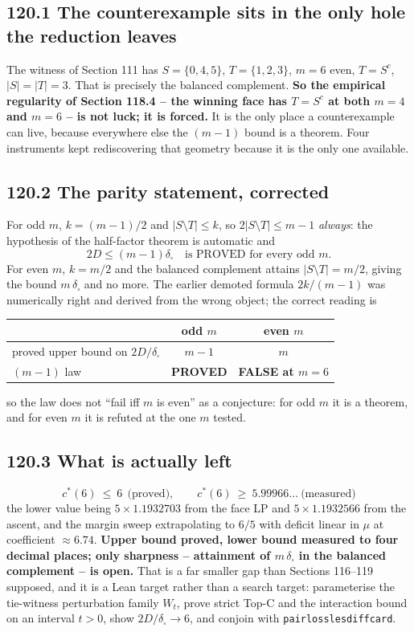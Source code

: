 \documentclass[9pt,twocolumn]{article}
\renewcommand{\_}{\CIGunderscore\allowbreak}
\begin{document}
\subsection*{120.1 The counterexample sits in the only hole the reduction leaves}
The witness of Section 111 has $S=\{0,4,5\}$, $T=\{1,2,3\}$, $m=6$ even, $T=S^{c}$, $|S|=|T|=3$. That is precisely the balanced complement. \textbf{So the empirical regularity of Section 118.4 -- the winning face has $T=S^{c}$ at both $m=4$ and $m=6$ -- is not luck; it is forced.} It is the only place a counterexample can live, because everywhere else the $(m-1)$ bound is a theorem. Four instruments kept rediscovering that geometry because it is the only one available.

\subsection*{120.2 The parity statement, corrected}
For odd $m$, $k=(m-1)/2$ and $|S\setminus T|\le k$, so $2|S\setminus T|\le m-1$ \emph{always}: the hypothesis of the half-factor theorem is automatic and
\[
2D\le(m-1)\delta_{\square}\quad\text{is PROVED for every odd }m.
\]
For even $m$, $k=m/2$ and the balanced complement attains $|S\setminus T|=m/2$, giving the bound $m\,\delta_{\square}$ and no more. The earlier demoted formula $2k/(m-1)$ was numerically right and derived from the wrong object; the correct reading is
\begin{center}\scriptsize
\begin{tabularx}{0.98\columnwidth}{Xcc}
\toprule
 & odd $m$ & even $m$\\
\midrule
proved upper bound on $2D/\delta_{\square}$ & $m-1$ & $m$\\
$(m-1)$ law & \textbf{PROVED} & \textbf{FALSE at $m{=}6$}\\
\bottomrule
\end{tabularx}
\end{center}
so the law does not ``fail iff $m$ is even'' as a conjecture: for odd $m$ it is a theorem, and for even $m$ it is refuted at the one $m$ tested.

\subsection*{120.3 What is actually left}
\[
c^\ast(6)\ \le\ 6\ \ \text{(proved)},\qquad
c^\ast(6)\ \ge\ 5.99966\ldots\ \text{(measured)}
\]
the lower value being $5\times1.1932703$ from the face LP and $5\times1.1932566$ from the ascent, and the margin sweep extrapolating to $6/5$ with deficit linear in $\mu$ at coefficient $\approx6.74$. \textbf{Upper bound proved, lower bound measured to four decimal places; only sharpness -- attainment of $m\,\delta_{\square}$ in the balanced complement -- is open.} That is a far smaller gap than Sections 116--119 supposed, and it is a Lean target rather than a search target: parameterise the tie-witness perturbation family $W_t$, prove strict Top-C and the interaction bound on an interval $t>0$, show $2D/\delta_{\square}\to6$, and conjoin with \texttt{pair\_loss\_le\_sdiff\_card}.
\end{document}
